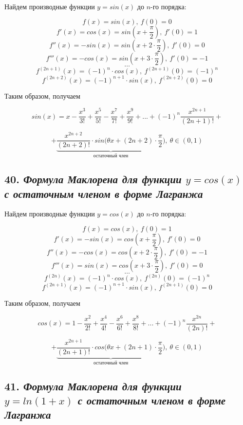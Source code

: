 Найдем производные функции $y = sin(x)$ до $n$-го порядка:

$$f(x) = sin(x), \ f(0) = 0$$ $$f'(x) = cos(x) = sin(x + \dfrac{\pi}{2}), \ f'(0)=1$$ $$f''(x) = -sin(x) = sin(x + 2\cdot \dfrac{\pi}{2}), \ f'(0)=0$$ $$f'''(x) = -cos(x) = sin(x + 3\cdot \dfrac{\pi}{2}), \ f'(0) = -1$$ $$\dots$$ $$f^{(2n + 1)}(x) = (-1)^{n}\cdot cos(x), \ f^{(2n + 1)}(0) = (-1)^{n}$$ $$f^{(2n + 2)}(x) = (-1)^{n+1}\cdot sin(x), \ f^{(2n + 2)}(0) = 0$$

Таким образом, получаем
\begin{mainQuote}

$$ sin(x) = x - \dfrac{x^3}{3!} + \dfrac{x^5}{5!}- \dfrac{x^7}{7!} + \dfrac{x^9}{9!}+...+(-1)^{n}\dfrac{x^{2n+1}}{(2n + 1)!} + $$

$$ + \underbrace{\dfrac{x^{2n+2}}{(2n + 2)!}\cdot sin\bigg(\theta x + (2n + 2)\cdot\dfrac{\pi}{2}\bigg)}_{\text{остаточный \ член}}, \ \theta \in (0, 1) $$
\end{mainQuote}
\newpage 
\subsection*{40. \textit{Формула Маклорена для функции $y = cos(x)$ с остаточным членом в форме Лагранжа}}

Найдем производные функции $y = cos(x)$ до $n$-го порядка:

$$f(x) = cos(x), \ f(0) = 1$$ $$f'(x) = -sin(x) = cos(x + \dfrac{\pi}{2}), \ f'(0)=0$$ $$f''(x) = -cos(x) = cos(x + 2\cdot \dfrac{\pi}{2}), \ f'(0)=-1$$ $$f'''(x) = sin(x) = cos(x + 3\cdot \dfrac{\pi}{2}), \ f'(0) = 0$$ $$\dots$$ $$f^{(2n)}(x) = (-1)^{n}\cdot cos(x), \ f^{(2n)}(0) = (-1)^{n}$$ $$f^{(2n + 1)}(x) = (-1)^{n+1}\cdot sin(x), \ f^{(2n + 1)}(0) = 0$$

Таким образом, получаем
\begin{mainQuote}

$$ cos(x) = 1 - \frac{x^2}{2!} + \frac{x^4}{4!}- \frac{x^6}{6!} + \frac{x^8}{8!}+...+(-1)^{n}\frac{x^{2n}}{(2n)!} + $$

$$ + \underbrace{\frac{x^{2n+1}}{(2n + 1)!}\cdot cos\bigg(\theta x + (2n + 1)\cdot\frac{\pi}{2}\bigg)}_{\text{остаточный \ член}},\  \theta \in (0, 1) $$
\end{mainQuote}
\newpage 
\subsection*{41. \textit{Формула Маклорена для функции $y = ln(1 + x)$ с остаточным членом в форме Лагранжа}}

